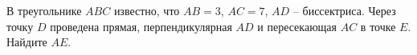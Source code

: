 \begin{ex}
	\begin{condition}
		В треугольнике \( ABC  \) известно, что \( AB=3 \), \( AC=7 \), \( AD \) – биссектриса. Через точку \( D  \) проведена прямая, перпендикулярная \( AD \) и пересекающая \( AC  \) в точке \( E \). Найдите \( AE \).
	\end{condition}
\end{ex}